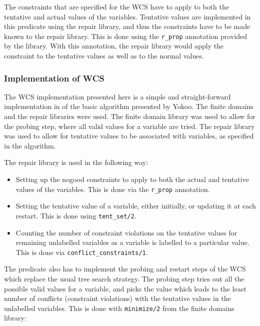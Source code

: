 The constraints that are specified for the WCS have to apply to both the
tentative and actual values of the variables. Tentative values are
implemented in this predicate using the repair library, and thus the
constraints have to be made known to the repair library. This is done using
the \verb'r_prop' annotation provided by the library. With this annotation, the
repair library would apply the constraint to the tentative values as well
as to the normal values. 


\subsubsection{Implementation of WCS}

The WCS implementation presented here is a simple and straight-forward
implementation in {\eclipse} of the basic algorithm presented by Yokoo.
The finite domains and the repair libraries were used. The finite domain
library was used to allow for the probing step, where all valid values for
a variable are tried. The repair library was used to allow for tentative
values to be associated with variables, as specified in the algorithm.

The repair library is used in the following way:

\begin{itemize}
\item Setting up the nogood constraints to apply to both the actual and
tentative values of the variables. This is done via the \verb'r_prop'
annotation.
\item Setting the tentative value of a variable, either initially, or
updating it at each restart. This is done using \verb'tent_set/2'. 
\item  Counting the number of constraint violations on the
tentative values for remaining unlabelled variables as a variable is
labelled to a particular value. This is done via
{\tt conflict_constraints/1}.
\end{itemize}

The predicate also has to implement the probing and restart steps of the
WCS which replace the usual tree search strategy. The probing
step tries out all the possible valid values for a variable, and picks the
value which leads to the least number of conflicts (constraint violations)
with the tentative values in the unlabelled variables. This is done with
\verb'minimize/2' from the finite domains library:

